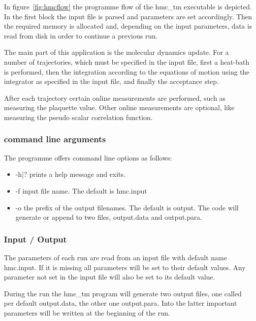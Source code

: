 In figure~\ref{fig:hmcflow} the programme flow of the {\ttfamily
  hmc\_tm} executable is depicted. In the first block the input file
is parsed and parameters are set accordingly. Then the required memory
is allocated and, depending on the input parameters, data is read from
disk in order to continue a previous run. 

The main part of this application is the molecular dynamics
update. For a number of trajectories, which must be specified in the
input file, first a heat-bath is performed, then the integration
according to the equations of motion using the integrator as specified
in the input file, and finally the acceptance step. 

After each trajectory certain online measurements are performed,
such as measuring the plaquette value. Other online measurements are
optional, like measuring the pseudo scalar correlation function. 

\subsubsection{command line arguments}

The programme offers command line options as follows:
\begin{itemize}
\item {\ttfamily -h|?} prints a help message and exits.
\item {\ttfamily -f} input file name. The default is {\ttfamily
    hmc.input}
\item {\ttfamily -o} the prefix of the output filenames. The default is
  {\ttfamily output}. The code will generate or append to two files,
  {\ttfamily output.data} and {\ttfamily output.para}.
\end{itemize}

\subsubsection{Input / Output}

The parameters of each run are read from an input file with default
name {\ttfamily hmc.input}. If it is missing all parameters will be
set to their default values. Any parameter not set in the input file
will also be set to its default value.

During the run the {\ttfamily hmc\_tm} program will generate two
output files, one called per default {\ttfamily output.data}, the
other one {\ttfamily output.para}. Into the latter important
parameters will be written at the beginning of the run.

